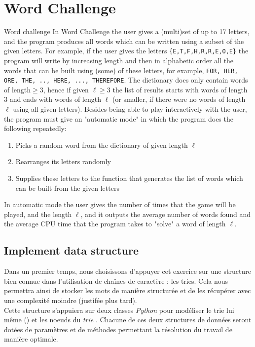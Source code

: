 \documentclass[10pt,a4paper,hidelinks]{article}
\begin{document}
\section{Word Challenge}
\begin{exercise_description}{Word challenge}
    In Word Challenge the user gives a (multi)set of up to 17 letters, and the program produces all words which can be written using a subset of the given letters. For example, if the user gives the letters \verb|{E,T,F,H,R,R,E,O,E}| the program will write by increasing length and then in alphabetic order all the words that can be built using (some) of these letters, for example, \verb|FOR, HER, ORE, THE, .., HERE, ..., THEREFORE|. The dictionary does only contain words of $\text{length}\geqslant  3$, hence if given $\ell \geqslant 3$ the list of results starts with words of length 3 and ends with words of length $\ell$ (or smaller, if there were no words of length $\ell$ using all given letters). Besides being able to play interactively with the user, the program must give an "automatic mode" in which the program does the following repeatedly:
    \begin{enumerate}
    \item Picks a random word from the dictionary of given length $\ell$
    \item Rearranges its letters randomly
    \item Supplies these letters to the function that generates the list of words which can be built from the given letters
    \end{enumerate}
    In automatic mode the user gives the number of times that the game will be played, and the length $\ell$, and it outputs the average number of words found and the average CPU time that the program takes to "solve" a word of length $\ell$.
\end{exercise_description}


\subsection{Implement  data structure}
Dans un premier temps, nous choisissons d'appuyer cet exercice sur une structure bien connue dans l'utilisation de chaînes de caractère : les tries. Cela nous permettra ainsi de stocker les mots de manière structurée et de les récupérer avec une complexité moindre (justifée plus tard).\\

Cette structure s'appuiera sur deux classes \textit{Python} pour modéliser le trie lui même () et les noeuds du \textit{trie} . Chacune de ces deux structures de données seront dotées de paramètres et de méthodes permettant la résolution du travail de manière optimale.
\end{document}
